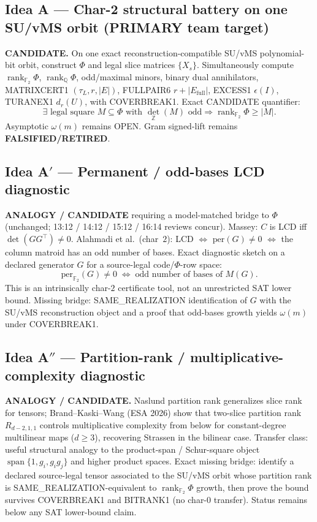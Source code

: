 \documentclass[11pt]{article}
\begin{document}
\subsection*{Idea A --- Char-2 structural battery on one SU/vMS orbit (PRIMARY team target)}
\textbf{CANDIDATE.} On one exact reconstruction-compatible SU/vMS polynomial-bit
orbit, construct $\Phi$ and legal slice matrices $\{X_s\}$. Simultaneously compute
$\operatorname{rank}_{\mathbb F_2}\Phi$, $\operatorname{rank}_{\mathbb Q}\Phi$,
odd/maximal minors, binary dual annihilators, MATRIXCERT1 $(\tau_L,r,|E|)$,
FULLPAIR6 $r+|E_{\mathrm{full}}|$, EXCESS1 $\epsilon(I)$, TURANEX1 $d_r(U)$, with
COVERBREAK1. Exact CANDIDATE quantifier:
\[
\exists\text{ legal square }M\subseteq\Phi\text{ with }\det_{\mathbb Z}(M)\text{ odd}
\Rightarrow\operatorname{rank}_{\mathbb F_2}\Phi\ge|M|.
\]
Asymptotic $\omega(m)$ remains OPEN. Gram signed-lift remains
\textbf{FALSIFIED/RETIRED}.

\subsection*{Idea A$'$ --- Permanent / odd-bases LCD diagnostic}
\textbf{ANALOGY / CANDIDATE} requiring a model-matched bridge to $\Phi$ (unchanged;
13:12 / 14:12 / 15:12 / 16:14 reviews concur). Massey: $C$ is LCD iff
$\det(GG^\top)\neq 0$. Alahmadi et al.\ (char~$2$): LCD $\Leftrightarrow$
$\mathrm{per}(G)\neq 0$ $\Leftrightarrow$ the column matroid has an odd number of
bases. Exact diagnostic sketch on a declared generator $G$ for a source-legal
code/$\Phi$-row space:
\[
\mathrm{per}_{\mathbb F_2}(G)\neq 0\;\Leftrightarrow\;\text{odd number of bases of }M(G).
\]
This is an intrinsically char-$2$ certificate tool, not an unrestricted SAT lower
bound. Missing bridge: SAME\_REALIZATION identification of $G$ with the SU/vMS
reconstruction object and a proof that odd-bases growth yields $\omega(m)$ under
COVERBREAK1.

\subsection*{Idea A$''$ --- Partition-rank / multiplicative-complexity diagnostic}
\textbf{ANALOGY / CANDIDATE.} Naslund partition rank generalizes slice rank for
tensors; Brand--Kaski--Wang (ESA 2026) show that two-slice partition rank
$R_{d-2,1,1}$ controls multiplicative complexity from below for constant-degree
multilinear maps ($d\ge 3$), recovering Strassen in the bilinear case. Transfer
class: useful structural analogy to the product-span / Schur-square object
$\operatorname{span}\{1,g_i,g_ig_j\}$ and higher product spaces. Exact missing
bridge: identify a declared source-legal tensor associated to the SU/vMS orbit
whose partition rank is SAME\_REALIZATION-equivalent to
$\operatorname{rank}_{\mathbb F_2}\Phi$ growth, then prove the bound survives
COVERBREAK1 and BITRANK1 (no char-$0$ transfer). Status remains below any SAT
lower-bound claim.
\end{document}
